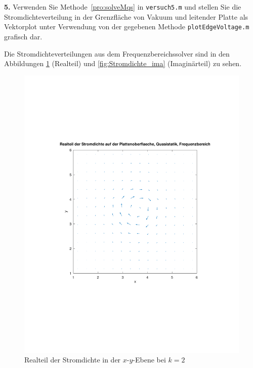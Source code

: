 \documentclass[Protokollheft.tex]{subfiles}
\begin{document}
\begin{framed}
	\noindent \textbf{5.} Verwenden Sie Methode~\eqref{pro:solveMqs} in \lstinline{versuch5.m} und stellen Sie die Stromdichteverteilung in der Grenzfläche von Vakuum und leitender Platte als Vektorplot unter Verwendung von der gegebenen Methode \lstinline{plotEdgeVoltage.m} grafisch dar.\label{exer:currentDensityAtInterface}
\end{framed}
\noindent
Die Stromdichteverteilungen aus dem Frequenzbereichssolver sind in den Abbildungen \ref{fig:Stromdichte_real} (Realteil) und \ref{fig:Stromdichte_ima} (Imaginärteil) zu sehen.
\begin{figure}[h]
	\centering
	\includegraphics[trim = 15mm 65mm 15mm 65mm, clip,width=0.7\linewidth]{Stromdichte_real.pdf}
	\caption{Realteil der Stromdichte in der $x$-$y$-Ebene bei $k=2$}
	\label{fig:Stromdichte_real}
\end{figure}
\end{document}
